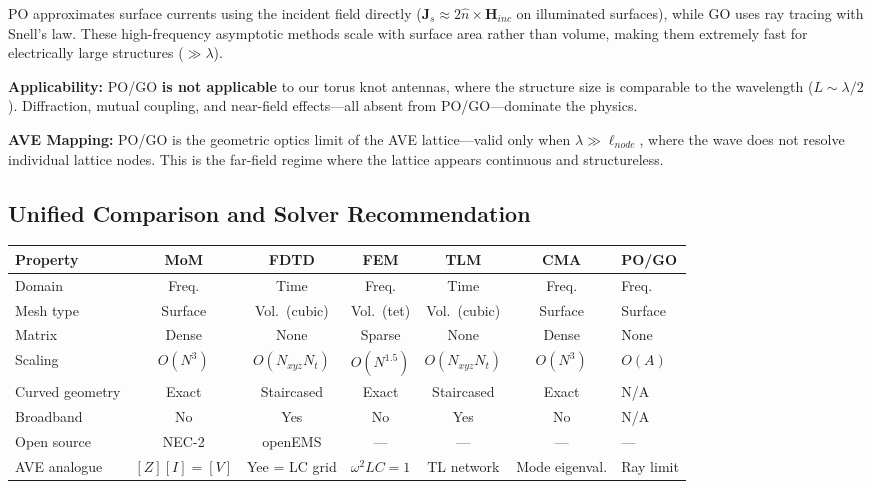 PO approximates surface currents using the incident field directly ($\mathbf{J}_s \approx 2\hat{n} \times \mathbf{H}_{inc}$ on illuminated surfaces), while GO uses ray tracing with Snell's law. These high-frequency asymptotic methods scale with surface area rather than volume, making them extremely fast for electrically large structures ($\gg \lambda$).

\textbf{Applicability:} PO/GO \textbf{is not applicable} to our torus knot antennas, where the structure size is comparable to the wavelength ($L \sim \lambda/2$). Diffraction, mutual coupling, and near-field effects---all absent from PO/GO---dominate the physics.

\textbf{AVE Mapping:} PO/GO is the geometric optics limit of the AVE lattice---valid only when $\lambda \gg \ell_{node}$, where the wave does not resolve individual lattice nodes. This is the far-field regime where the lattice appears continuous and structureless.

\subsection{Unified Comparison and Solver Recommendation}

\begin{center}
\scriptsize
\renewcommand{\arraystretch}{1.2}
\begin{tabularx}{\textwidth}{@{}lcccccX@{}}
\toprule
\textbf{Property} & \textbf{MoM} & \textbf{FDTD} & \textbf{FEM} & \textbf{TLM} & \textbf{CMA} & \textbf{PO/GO} \\
\midrule
Domain          & Freq.   & Time    & Freq.   & Time    & Freq.   & Freq.   \\
Mesh type       & Surface & Vol.\ (cubic) & Vol.\ (tet) & Vol.\ (cubic) & Surface & Surface \\
Matrix          & Dense   & None    & Sparse  & None    & Dense   & None    \\
Scaling         & $O(N^3)$ & $O(N_{xyz} N_t)$ & $O(N^{1.5})$ & $O(N_{xyz} N_t)$ & $O(N^3)$ & $O(A)$ \\
Curved geometry & Exact   & Staircased & Exact & Staircased & Exact & N/A \\
Broadband       & No      & Yes     & No      & Yes     & No      & N/A \\
Open source     & NEC-2   & openEMS & ---     & ---     & ---     & --- \\
AVE analogue    & $[Z][I]=[V]$  & Yee = LC grid & $\omega^2 LC = 1$ & TL network & Mode eigenval. & Ray limit \\
\bottomrule
\end{tabularx}
\end{center}

